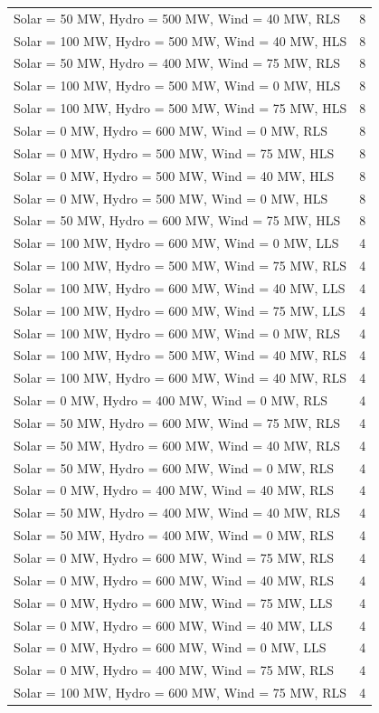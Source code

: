 \documentclass[10pt]{report}
\begin{document}
\begin{table}[H]
{\begin{tabular}{lr}
Solar = 50 MW, Hydro = 500 MW, Wind = 40 MW, RLS & 8 \\
Solar = 100 MW, Hydro = 500 MW, Wind = 40 MW, HLS & 8 \\
Solar = 50 MW, Hydro = 400 MW, Wind = 75 MW, RLS & 8 \\
Solar = 100 MW, Hydro = 500 MW, Wind = 0 MW, HLS & 8 \\
Solar = 100 MW, Hydro = 500 MW, Wind = 75 MW, HLS & 8 \\
Solar = 0 MW, Hydro = 600 MW, Wind = 0 MW, RLS & 8 \\
Solar = 0 MW, Hydro = 500 MW, Wind = 75 MW, HLS & 8 \\
Solar = 0 MW, Hydro = 500 MW, Wind = 40 MW, HLS & 8 \\
Solar = 0 MW, Hydro = 500 MW, Wind = 0 MW, HLS & 8 \\
Solar = 50 MW, Hydro = 600 MW, Wind = 75 MW, HLS & 8 \\
Solar = 100 MW, Hydro = 600 MW, Wind = 0 MW, LLS & 4 \\
Solar = 100 MW, Hydro = 500 MW, Wind = 75 MW, RLS & 4 \\
Solar = 100 MW, Hydro = 600 MW, Wind = 40 MW, LLS & 4 \\
Solar = 100 MW, Hydro = 600 MW, Wind = 75 MW, LLS & 4 \\
Solar = 100 MW, Hydro = 600 MW, Wind = 0 MW, RLS & 4 \\
Solar = 100 MW, Hydro = 500 MW, Wind = 40 MW, RLS & 4 \\
Solar = 100 MW, Hydro = 600 MW, Wind = 40 MW, RLS & 4 \\
Solar = 0 MW, Hydro = 400 MW, Wind = 0 MW, RLS & 4 \\
Solar = 50 MW, Hydro = 600 MW, Wind = 75 MW, RLS & 4 \\
Solar = 50 MW, Hydro = 600 MW, Wind = 40 MW, RLS & 4 \\
Solar = 50 MW, Hydro = 600 MW, Wind = 0 MW, RLS & 4 \\
Solar = 0 MW, Hydro = 400 MW, Wind = 40 MW, RLS & 4 \\
Solar = 50 MW, Hydro = 400 MW, Wind = 40 MW, RLS & 4 \\
Solar = 50 MW, Hydro = 400 MW, Wind = 0 MW, RLS & 4 \\
Solar = 0 MW, Hydro = 600 MW, Wind = 75 MW, RLS & 4 \\
Solar = 0 MW, Hydro = 600 MW, Wind = 40 MW, RLS & 4 \\
Solar = 0 MW, Hydro = 600 MW, Wind = 75 MW, LLS & 4 \\
Solar = 0 MW, Hydro = 600 MW, Wind = 40 MW, LLS & 4 \\
Solar = 0 MW, Hydro = 600 MW, Wind = 0 MW, LLS & 4 \\
Solar = 0 MW, Hydro = 400 MW, Wind = 75 MW, RLS & 4 \\
Solar = 100 MW, Hydro = 600 MW, Wind = 75 MW, RLS & 4 \\
\bottomrule
\end{tabular}}
\end{table}
\end{document}
